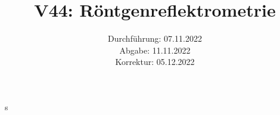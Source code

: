 



\title{V44: Röntgenreflektrometrie}

\date{Durchführung: 07.11.2022\\
      Abgabe: 11.11.2022\\
      Korrektur: 05.12.2022}



\maketitle
\thispagestyle{empty}

\newpage
s



% 
%



\newpage 
\printbibliography{}










%
%
%




%
